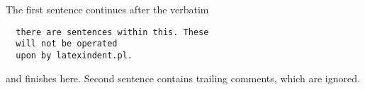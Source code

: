 The first sentence continues after the verbatim \begin{verbatim}
  there are sentences within this. These 
  will not be operated
  upon by latexindent.pl. 
\end{verbatim} and finishes here.
Second sentence contains trailing comments, which are ignored.
